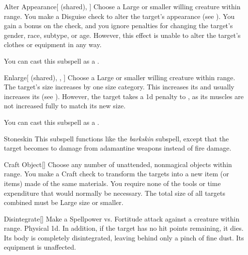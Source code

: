 \begin{ability}[\nth{3}]{Alter Appearance}[ (shared), ]
Choose a Large or smaller willing creature within \rngclose range.
You make a Disguise check to alter the target's appearance (see ).
You gain a  bonus on the check, and you ignore penalties for changing the target's gender, race, subtype, or age.
However, this effect is unable to alter the target's clothes or equipment in any way.

You can cast this subspell as a .
\end{ability}
\vspace{0.25em}


\begin{ability}[\nth{3}]{Enlarge}[ (shared), , ]
Choose a Large or smaller willing creature within \rngclose range.
The target's size increases by one size category.
This increases its  and usually increases its  (see ).
However, the target takes a \minus1d penalty to , as its muscles are not increased fully to match its new size.

You can cast this subspell as a .
\end{ability}
\vspace{0.25em}


\begin{ability}[\nth{3}]{Stoneskin}
This subspell functions like the \textit{barkskin} subspell, except that the target becomes  to damage from adamantine weapons instead of fire damage.
\end{ability}
\vspace{0.25em}


\begin{ability}[\nth{4}]{Craft Object}[]
Choose any number of unattended, nonmagical objects within \rngclose range.
You make a Craft check to transform the targets into a new item (or items) made of the same materials.
You require none of the tools or time expenditure that would normally be necessary.
The total size of all targets combined must be Large size or smaller.
\end{ability}
\vspace{0.25em}


\begin{ability}[\nth{6}]{Disintegrate}[]
Make a Spellpower vs. Fortitude attack against a creature within \rngmed range.
\hit Physical  \plus1d.
In addition, if the target has no hit points remaining, it dies.
Its body is completely disintegrated, leaving behind only a pinch of fine dust.
Its equipment is unaffected.
\end{ability}
\vspace{0.25em}


